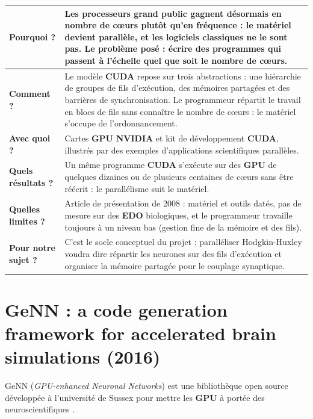 \medskip
\begin{tabular}{|p{3.2cm}|p{11.2cm}|}
\hline
\textbf{Pourquoi ?} & Les processeurs grand public gagnent désormais en nombre de cœurs plutôt qu'en fréquence : le matériel devient parallèle, et les logiciels classiques ne le sont pas. Le problème posé : écrire des programmes qui passent à l'échelle quel que soit le nombre de cœurs. \\ \hline
\textbf{Comment ?} & Le modèle \textbf{CUDA} repose sur trois abstractions : une hiérarchie de groupes de fils d'exécution, des mémoires partagées et des barrières de synchronisation. Le programmeur répartit le travail en blocs de fils sans connaître le nombre de cœurs : le matériel s'occupe de l'ordonnancement. \\ \hline
\textbf{Avec quoi ?} & Cartes \textbf{GPU} \textbf{NVIDIA} et kit de développement \textbf{CUDA}, illustrés par des exemples d'applications scientifiques parallèles. \\ \hline
\textbf{Quels résultats ?} & Un même programme \textbf{CUDA} s'exécute sur des \textbf{GPU} de quelques dizaines ou de plusieurs centaines de cœurs sans être réécrit : le parallélisme suit le matériel. \\ \hline
\textbf{Quelles limites ?} & Article de présentation de 2008 : matériel et outils datés, pas de mesure sur des \textbf{EDO} biologiques, et le programmeur travaille toujours à un niveau bas (gestion fine de la mémoire et des fils). \\ \hline
\textbf{Pour notre sujet ?} & C'est le socle conceptuel du projet : paralléliser Hodgkin-Huxley voudra dire répartir les neurones sur des fils d'exécution et organiser la mémoire partagée pour le couplage synaptique. \\ \hline
\end{tabular}

\newpage

\section{GeNN : a code generation framework for accelerated brain simulations (2016)}

GeNN (\emph{GPU-enhanced Neuronal Networks}) est une bibliothèque open source développée à l'université de Sussex pour mettre les \textbf{GPU} à portée des neuroscientifiques \cite{yavuz2016}.

